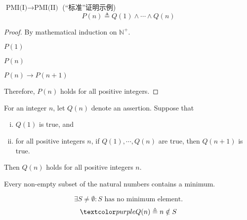 \begin{frame}{}
  \begin{exampleblock}{$\text{PMI(I)} \to \text{PMI(II)}$ (``标准''证明示例)}
    \[
      P(n) \triangleq Q(1) \land \cdots \land Q(n)
    \]

  \end{exampleblock}

  \vspace{0.60cm}
  \pause
  \begin{proof}
    By mathematical induction on $\mathbb{N}^{+}$.

    \begin{description}
      \item[Basis Step:] $P(1)$
      \item[\textcolor{cyan}{Inductive Hypothesis:}] $P(n)$
      \item[Inductive Step:] $P(n) \to P(n+1)$
    \end{description}

    Therefore, $P(n)$ holds for all positive integers.
  \end{proof}
\end{frame}

\begin{frame}{}
  \begin{theorem}
    For an integer $n$, let $Q(n)$ denote an assertion. Suppose that
    \begin{enumerate}[(i)]
      \item $Q(1)$ is true, and
      \item for all positive integers $n$, if $Q(1), \cdots, Q(n)$ are true,
	then $Q(n+1)$ is true.
    \end{enumerate}
    Then $Q(n)$ holds for all positive integers $n$.
  \end{theorem}

  \begin{theorem}
    Every non-empty subset of the natural numbers contains a minimum.
  \end{theorem}

  \pause
  \begin{center}
    \[
      \exists S \neq \emptyset: S \text{ has no minimum element.}
    \]
    \pause
    \vspace{-0.30cm}
    \[
      \purple{Q(n) \triangleq n \notin S}
    \]
  \end{center}
\end{frame}

